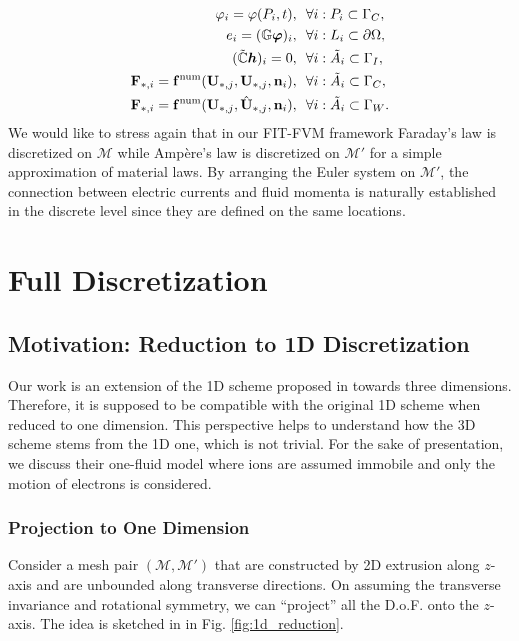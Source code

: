 \documentclass{article}
\begin{document}
\begin{subequations}
\begin{align}
    \varphi_i = \varphi(P_i, t), \ \ &\forall i : P_i \subset \Gamma_C, \\
    e_i = (\mathbb{G}\bm{\varphi})_i,\ \ &\forall i : L_i \subset \partial\Omega, \\
    (\Tilde{\mathbb{C}} \bm{h})_i = 0,\ \ &\forall i : \Tilde{A}_i \subset \Gamma_I, \label{equ:bc_zero_curl_h} \\
    \mathbf{F}_{\ast,i} = \mathbf{f}^\text{num}(\mathbf{U}_{\ast,j}, \mathbf{U}_{\ast,j}, \mathbf{n}_i), \ \ &\forall i: \Tilde{A}_i \subset \Gamma_C, \\
    \mathbf{F}_{\ast,i} = \mathbf{f}^\text{num}(\mathbf{U}_{\ast,j}, \hat{\mathbf{U}}_{\ast,j}, \mathbf{n}_i), \ \ &\forall i: \Tilde{A}_i \subset \Gamma_W.
    \end{align}
\end{subequations}
We would like to stress again that in our FIT-FVM framework Faraday's law is discretized on $\mathcal{M}$ while Amp\`{e}re's law is discretized on $\mathcal{M}'$ for a simple approximation of material laws. By arranging the Euler system on $\mathcal{M}'$, the connection between electric currents and fluid momenta is naturally established in the discrete level since they are defined on the same locations.    


\section{Full Discretization}
\subsection{Motivation: Reduction to 1D Discretization}
Our work is an extension of the 1D scheme proposed in \cite{degond_2012} towards three dimensions. Therefore, it is supposed to be compatible with the original 1D scheme when reduced to one dimension. This perspective helps to understand how the 3D scheme stems from the 1D one, which is not trivial. For the sake of presentation, we discuss their one-fluid model where ions are assumed immobile and only the motion of electrons is considered.  

\subsubsection{Projection to One Dimension} \label{sec:projection_to_1d}
Consider a mesh pair $(\mathcal{M}, \mathcal{M}')$ that are constructed by 2D extrusion along $z$-axis and are unbounded along transverse directions. On assuming the transverse invariance and rotational symmetry, we can ``project'' all the D.o.F. onto the $z$-axis. The idea is sketched in in Fig. \ref{fig:1d_reduction}.
\end{document}
